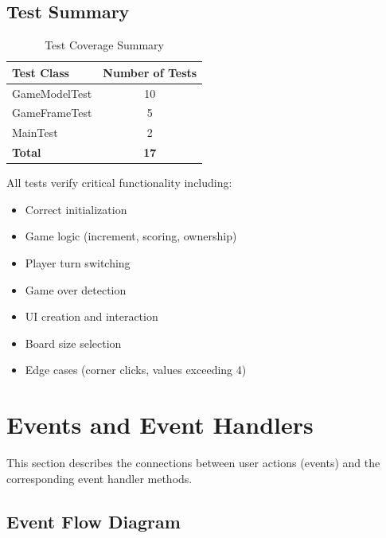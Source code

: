 \documentclass[12pt,a4paper]{article}
\begin{document}
\subsection{Test Summary}

\begin{table}[H]
\centering
\begin{tabular}{|l|c|}
\hline
\textbf{Test Class} & \textbf{Number of Tests} \\
\hline
GameModelTest & 10 \\
\hline
GameFrameTest & 5 \\
\hline
MainTest & 2 \\
\hline
\textbf{Total} & \textbf{17} \\
\hline
\end{tabular}
\caption{Test Coverage Summary}
\end{table}

All tests verify critical functionality including:
\begin{itemize}
    \item Correct initialization
    \item Game logic (increment, scoring, ownership)
    \item Player turn switching
    \item Game over detection
    \item UI creation and interaction
    \item Board size selection
    \item Edge cases (corner clicks, values exceeding 4)
\end{itemize}

\newpage

\section{Events and Event Handlers}

This section describes the connections between user actions (events) and the corresponding event handler methods.

\subsection{Event Flow Diagram}
\end{document}
